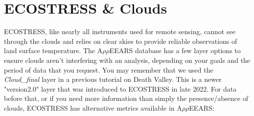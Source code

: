 \documentclass[oneside,a4paper,11pt,explicit]{book}
\begin{document}
	\noindent{}
	
	\vspace{1 em}

	\section{ECOSTRESS \& Clouds}
	
	ECOSTRESS, like nearly all instruments used for remote sensing, cannot see through the clouds and relies on clear skies to provide reliable observations of land surface temperature. The A$\rho\rho$EEARS database has a few layer options to ensure clouds aren't interfering with an analysis, depending on your goals and the period of data that you request. You may remember that we used the \textit{Cloud\_final} layer in a previous tutorial on Death Valley. This is a newer "version2.0" layer that was introduced to ECOSTRESS in late 2022. For data before that, or if you need more information than simply the presence/absence of clouds, ECOSTRESS has alternative metrics available in A$\rho\rho$EEARS:
	
\end{document}
